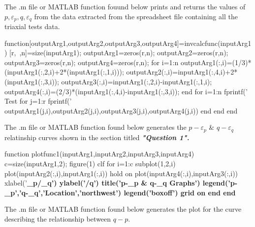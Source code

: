 \documentclass{article}
\begin{document}
\label{H_DE433A36}
\begin{par}
\begin{flushleft}
The .m file or MATLAB function fouund below prints and returns the values of $p,\varepsilon_{p},q,\varepsilon_{q}$ from the data extracted from the spreadsheet file containing all the triaxial tests data.
\end{flushleft}
\end{par}

\begin{matlabcode}
function[outputArg1,outputArg2,outputArg3,outputArg4]=invcalcfunc(inputArg1)
[r,~,n]=size(inputArg1);
outputArg1=zeros(r,n);
outputArg2=zeros(r,n);
outputArg3=zeros(r,n);
outputArg4=zeros(r,n);
for i=1:n
    outputArg1(:,i)=(1/3)*(inputArg1(:,2,i)+2*(inputArg1(:,1,i)));
    outputArg2(:,i)=inputArg1(:,4,i)+2*(inputArg1(:,3,i));
    outputArg3(:,i)=inputArg1(:,2,i)-inputArg1(:,1,i);
    outputArg4(:,i)=(2/3)*(inputArg1(:,4,i)-inputArg1(:,3,i));
end
for i=1:n
    fprintf('                    Test %
    for j=1:r
        fprintf('%
            outputArg1(j,i),outputArg2(j,i),outputArg3(j,i),outputArg4(j,i))
    end
end
end
\end{matlabcode}

\begin{par}
\begin{flushleft}
The .m file or MATLAB function found below generates the $p-\varepsilon_{p}$ \& $q-\varepsilon_{q}$ relatinship curves shown in the section titled \textit{\textbf{"Question 1".}}
\end{flushleft}
\end{par}

\begin{matlabcode}
function plotfunc1(inputArg1,inputArg2,inputArg3,inputArg4)
c=size(inputArg1,2);
figure(1)
clf
for i=1:c
    subplot(1,2,i)
    plot(inputArg2(:,i),inputArg1(:,i))
    hold on 
    plot(inputArg4(:,i),inputArg3(:,i))
    xlabel('\bf\epsilon_{p}/\epsilon_{q}')
    ylabel('\bfp/q')
    title('p-\epsilon_{p} & q-\epsilon_{q} Graphs')
    legend('p-\epsilon_{p}','q-\epsilon_{q}','Location','northwest')
    legend('boxoff')
    grid on 
end
end
\end{matlabcode}

\begin{par}
\begin{flushleft}
The .m file or MATLAB function found below generates the plot for the curve describing the relationship between $q-p$.
\end{flushleft}
\end{par}
\end{document}
